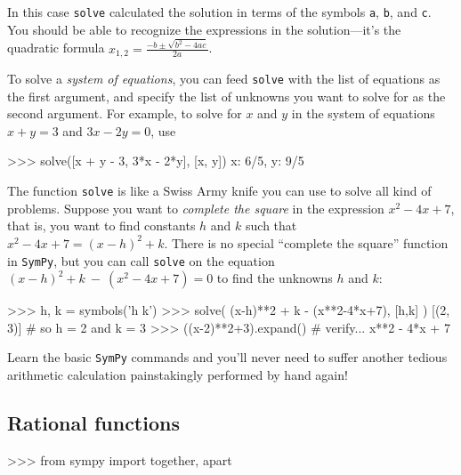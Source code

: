 \noindent
In this case \texttt{solve} calculated the solution in terms of the symbols \texttt{a}, \texttt{b}, and \texttt{c}.
You should be able to recognize the expressions in the solution---it's the quadratic formula $x_{1,2} = \frac{-b \pm \sqrt{b^2 - 4ac}}{2a}$.



\bigskip

\noindent
To solve a \emph{system of equations}, you can feed \texttt{solve} with the list of equations
as the first argument, and specify the list of unknowns you want to solve for as the second argument.
For example, to solve for $x$ and $y$ in the system of equations $x+y =3$ and $3x-2y=0$, use

\small
\begin{verbatimtab}
>>> solve([x + y - 3, 3*x - 2*y], [x, y])
{x: 6/5, y: 9/5}
\end{verbatimtab}
\normalsize

\bigskip

\noindent
The function \texttt{solve} is like a Swiss Army knife you can use to solve all kind of problems.
Suppose you want to \emph{complete the square} in the expression $x^2-4x+7$,
that is, you want to find constants $h$ and $k$ such that $x^2-4x+7 = (x-h)^2 +k$.
There is no special ``complete the square'' function in \texttt{SymPy},
but you can call \texttt{solve} on the equation $(x-h)^2 +k \ - \  (x^2-4x+7) = 0$
to find the unknowns $h$ and $k$:

\small
\begin{verbatimtab}
>>> h, k = symbols('h k')
>>> solve( (x-h)**2 + k  - (x**2-4*x+7), [h,k] )
[(2, 3)]                               # so h = 2 and k = 3
>>> ((x-2)**2+3).expand()              # verify...
x**2 - 4*x + 7
\end{verbatimtab}
\normalsize

\noindent
Learn the basic \texttt{SymPy} commands 
and you'll never need to suffer another tedious arithmetic calculation painstakingly performed by hand again!



\subsection{Rational functions}
\label{basics:rational_functions}

\small
\begin{verbatimtab}
>>> from sympy import together, apart
\end{verbatimtab}
\normalsize

